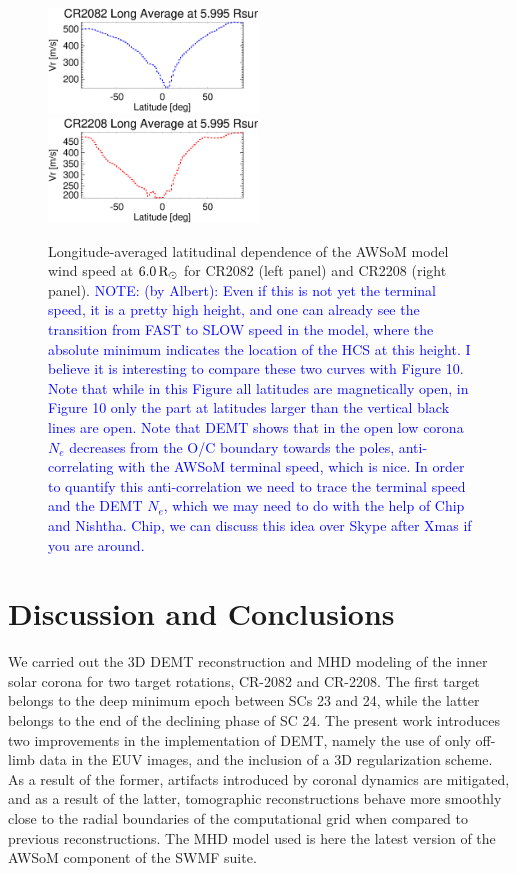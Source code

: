 \documentclass[namedreferences]{solarphysics}
\newcommand{\mrsun}{{\rm R_\odot}}
\def\notebyalbert#1{\textcolor{blue}{NOTE: #1}}
\begin{document}
\begin{article}
\begin{figure}[h!]
\begin{center}
\includegraphics[width=0.495\textwidth]{figs/Perfil_Vr_2082_5995.eps}
\includegraphics[width=0.495\textwidth]{figs/Perfil_Vr_2208_5995.eps}
\caption{{Longitude-averaged latitudinal dependence of the AWSoM model wind speed at $6.0\,\mrsun$ for CR2082 (left panel) and CR2208 (right panel).} \notebyalbert{(by Albert): Even if this is not yet the terminal speed, it is a pretty high height, and one can already see the transition from FAST to SLOW speed in the model, where the absolute minimum indicates the location of the HCS at this height. I believe it is interesting to compare these two curves with Figure 10. Note that while in this Figure all latitudes are magnetically open, in Figure 10 only the part at latitudes larger than the vertical black lines are open. Note that DEMT shows that in the open low corona $N_e$ decreases from the O/C boundary towards the poles, anti-correlating with the AWSoM terminal speed, which is nice. In order to quantify this anti-correlation we need to trace the terminal speed and the DEMT $N_e$, which we may need to do with the help of Chip and Nishtha. Chip, we can discuss this idea over Skype after Xmas if you are around.}}
\label{perf_lon_vr}
\end{center}
\end{figure}

\section{{Discussion and Conclusions}}\label{discu} 

{We carried out the 3D DEMT reconstruction and MHD modeling of the inner solar corona for two target rotations, CR-2082 and CR-2208. The first target belongs to the deep minimum epoch between SCs 23 and 24, while the latter belongs to the end of the declining phase of SC 24. The present work introduces two improvements in the implementation of DEMT, namely the use of only off-limb data in the EUV images, and the inclusion of a 3D regularization scheme. As a result of the former, artifacts introduced by coronal dynamics are mitigated, and as a result of the latter, tomographic reconstructions behave more smoothly close to the radial boundaries of the computational grid when compared to previous reconstructions. The MHD model used is here the latest version of the AWSoM component of the SWMF suite.}


\end{article}
\end{document}
